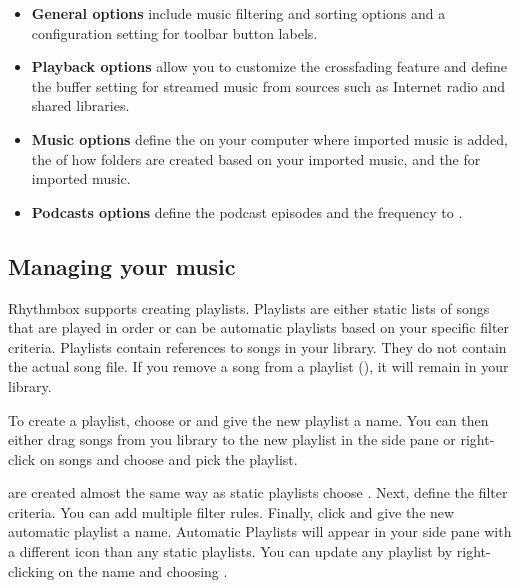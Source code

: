 \begin{itemize}
\item \textbf{General options} include music filtering and sorting options and a configuration setting for toolbar button labels.

\item \textbf{Playback options} allow you to customize the crossfading feature and define the buffer setting for streamed music from sources such as Internet radio and shared libraries.

\item \textbf{Music options} define the  on your computer where imported music is added, the  of how folders are created based on your imported music, and the  for imported music.

\item \textbf{Podcasts options} define the  podcast episodes and the frequency to .
\end{itemize}

\subsection{Managing your music}
Rhythmbox supports creating playlists. Playlists are either static lists of songs that are played in order or can be automatic playlists based on your specific filter criteria. Playlists contain references to songs in your library. They do not contain the actual song file. If you remove a song from a playlist (), it will remain in your library.

To create a playlist, choose  or  and give the new playlist a name. You can then either drag songs from you library to the new playlist in the side pane or right-click on songs and choose  and pick the playlist.

 are created almost the same way as static playlists \dash choose . Next, define the filter criteria. You can add multiple filter rules. Finally, click  and give the new automatic playlist a name. Automatic Playlists will appear in your side pane with a different icon than any static playlists. You can update any playlist by right-clicking on the name and choosing .

